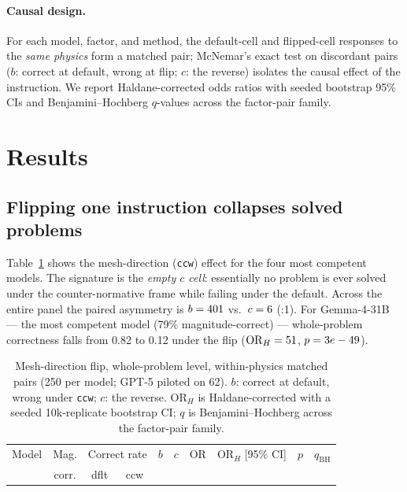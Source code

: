 \documentclass[11pt]{article}
\begin{document}
\paragraph{Causal design.}
For each model, factor, and method, the default-cell and flipped-cell
responses to the \emph{same physics} form a matched pair; McNemar's exact test
on discordant pairs ($b$: correct at default, wrong at flip; $c$: the
reverse) isolates the causal effect of the instruction. We report
Haldane-corrected odds ratios with seeded bootstrap 95\% CIs and
Benjamini--Hochberg $q$-values across the factor-pair family.

\section{Results}

\subsection{Flipping one instruction collapses solved problems}
\label{sec:headline}

Table~\ref{tab:main} shows the mesh-direction (\texttt{ccw}) effect for the
four most competent models. The signature is the \emph{empty $c$ cell}:
essentially no problem is ever solved under the counter-normative frame while
failing under the default. Across the entire panel the paired asymmetry is
$b=401$ vs.\ $c=6$ (\AggRatio:1). For Gemma-4-31B --- the most
competent model (79\% magnitude-correct) --- whole-problem correctness falls
from 0.82 to 0.12 under the flip ($\mathrm{OR}_H=51$,
$p=3e-49$).

\begin{table}[t]
\centering\small
\begin{tabular}{lccccccccc}
\toprule
Model & Mag. & \multicolumn{2}{c}{Correct rate} & $b$ & $c$ & OR &
OR$_H$ [95\% CI] & $p$ & $q_{\mathrm{BH}}$\\
 & corr. & dflt & ccw & & & & & & \\
\midrule

\bottomrule
\end{tabular}
\caption{Mesh-direction flip, whole-problem level, within-physics matched
pairs (250 per model; GPT-5 piloted on 62). $b$: correct at default, wrong
under \texttt{ccw}; $c$: the reverse. OR$_H$ is Haldane-corrected with a
seeded 10k-replicate bootstrap CI; $q$ is Benjamini--Hochberg across the
factor-pair family.}
\label{tab:main}
\end{table}
\end{document}
